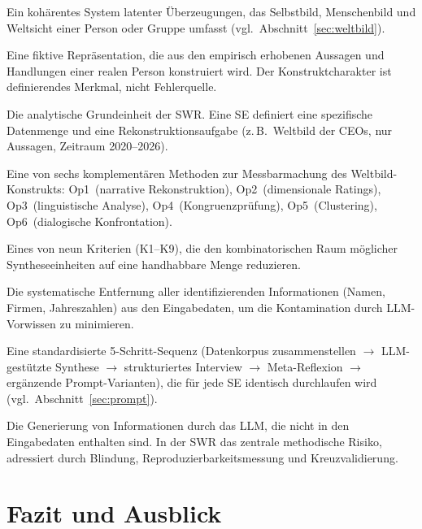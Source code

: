 \documentclass[11pt,a4paper]{article}
\theoremstyle{definition}
\theoremstyle{plain}
\theoremstyle{remark}
\begin{document}
\begin{description}[style=nextline, leftmargin=2.5cm, font=\bfseries\sffamily]
  \item[Weltbild] Ein koh\"arentes System latenter \"Uberzeugungen, das Selbstbild, Menschenbild und Weltsicht einer Person oder Gruppe umfasst (vgl.\ Abschnitt~\ref{sec:weltbild}).
  \item[Synthetische Person] Eine fiktive Repr\"asentation, die aus den empirisch erhobenen Aussagen und Handlungen einer realen Person konstruiert wird. Der Konstruktcharakter ist definierendes Merkmal, nicht Fehlerquelle.
  \item[Syntheseeinheit (SE)] Die analytische Grundeinheit der SWR. Eine SE definiert eine spezifische Datenmenge und eine Rekonstruktionsaufgabe (z.\,B.\ \glqq Weltbild der CEOs, nur Aussagen, Zeitraum 2020--2026\grqq{}).
  \item[Operationalisierung (Op)] Eine von sechs komplementären Methoden zur Messbarmachung des Weltbild-Konstrukts: Op1~(narrative Rekonstruktion), Op2~(dimensionale Ratings), Op3~(linguistische Analyse), Op4~(Kongruenzpr\"ufung), Op5~(Clustering), Op6~(dialogische Konfrontation).
  \item[Reduktionskriterium (K)] Eines von neun Kriterien (K1--K9), die den kombinatorischen Raum m\"oglicher Syntheseeinheiten auf eine handhabbare Menge reduzieren.
  \item[Blindung] Die systematische Entfernung aller identifizierenden Informationen (Namen, Firmen, Jahreszahlen) aus den Eingabedaten, um die Kontamination durch LLM-Vorwissen zu minimieren.
  \item[Prompt-Protokoll] Eine standardisierte 5-Schritt-Sequenz (Datenkorpus zusammenstellen $\to$ LLM-gest\"utzte Synthese $\to$ strukturiertes Interview $\to$ Meta-Reflexion $\to$ erg\"anzende Prompt-Varianten), die f\"ur jede SE identisch durchlaufen wird (vgl.\ Abschnitt~\ref{sec:prompt}).
  \item[Halluzination] Die Generierung von Informationen durch das LLM, die nicht in den Eingabedaten enthalten sind. In der SWR das zentrale methodische Risiko, adressiert durch Blindung, Reproduzierbarkeitsmessung und Kreuzvalidierung.
\end{description}



\section{Fazit und Ausblick}
\label{sec:fazit}
\end{document}
